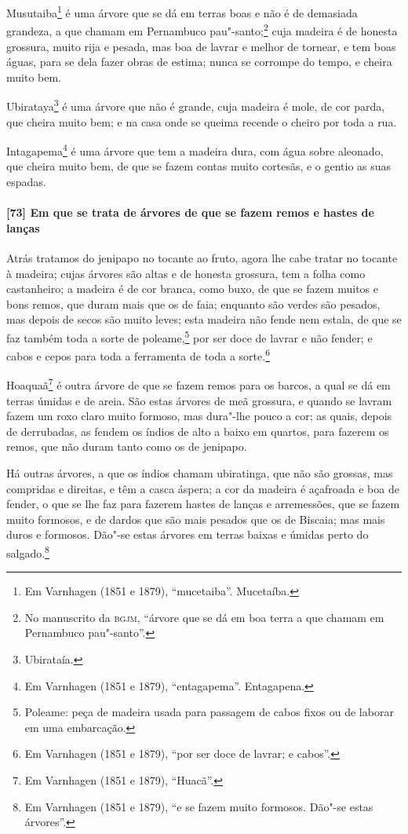 \begin{linenumbers}
Musutaiba\footnote{ Em Varnhagen (1851 e 1879), ``mucetaiba''. Mucetaíba.} é uma árvore
que se dá em terras boas e não é de demasiada grandeza, a que chamam em Pernambuco
pau"-santo;\footnote{ No manuscrito da \textsc{bgjm}, ``árvore que se dá em boa terra a que
chamam em Pernambuco pau"-santo''.} cuja madeira é de honesta grossura, muito rija e
pesada, mas boa de lavrar e melhor de tornear, e tem boas águas, para se dela fazer obras
de estima; nunca se corrompe do tempo, e cheira muito bem.

Ubirataya\footnote{ Ubirataía.} é uma árvore que não é grande, cuja madeira é mole, de cor
parda, que cheira muito bem; e na casa onde se queima recende o cheiro por toda a rua.

Intagapema\footnote{ Em Varnhagen (1851 e 1879), ``entagapema''. Entagapena.} é uma árvore
que tem a madeira dura, com água sobre aleonado, que cheira muito bem, de que se fazem
contas muito cortesãs, e o gentio as suas espadas.

\paragraph{[73] Em que se trata de árvores de que se fazem remos e hastes de lanças}\quad
Atrás tratamos do jenipapo no tocante ao fruto, agora lhe cabe tratar no tocante à
madeira; cujas árvores são altas e de honesta grossura, tem a folha como castanheiro; a
madeira é de cor branca, como buxo, de que se fazem muitos e bons remos, que duram mais
que os de faia; enquanto são verdes são pesados, mas depois de secos são muito leves; esta
madeira não fende nem estala, de que se faz também toda a sorte de poleame,\footnote{
Poleame: peça de madeira usada para passagem de cabos fixos ou de laborar em uma
embarcação.} por ser doce de lavrar e não fender; e cabos e cepos para toda a ferramenta
de toda a sorte.\footnote{ Em Varnhagen (1851 e 1879), ``por ser doce de lavrar; e
cabos''.}

Hoaquaã\footnote{ Em Varnhagen (1851 e 1879), ``Huacã''.} é outra árvore de que se fazem
remos para os barcos, a qual se dá em terras úmidas e de areia. São estas árvores de meã
grossura, e quando se lavram fazem um roxo claro muito formoso, mas dura"-lhe pouco a cor;
as quais, depois de derrubadas, as fendem os índios de alto a baixo em quartos, para
fazerem os remos, que não duram tanto como os de jenipapo.

Há outras árvores, a que os índios chamam ubiratinga, que não são grossas, mas compridas e
direitas, e têm a casca áspera; a cor da madeira é açafroada e boa de fender, o que se lhe
faz para fazerem hastes de lanças e arremessões, que se fazem muito formosos, e de dardos
que são mais pesados que os de Biscaia; mas mais duros e formosos. Dão"-se estas árvores em
terras baixas e úmidas perto do salgado.\footnote{ Em Varnhagen (1851 e 1879), ``e se
fazem muito formosos. Dão"-se estas árvores''.}


\end{linenumbers}
